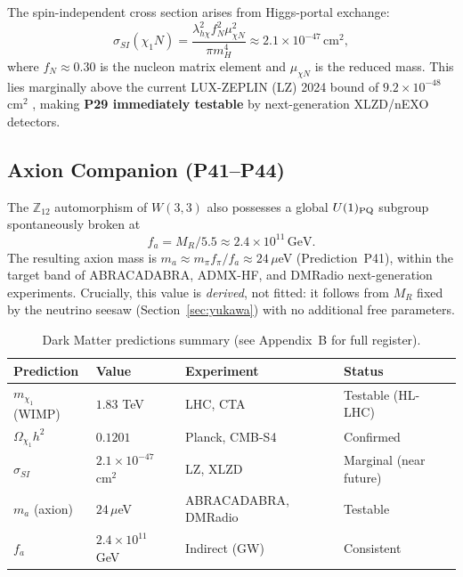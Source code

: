 The spin-independent cross section arises from Higgs-portal exchange:
\begin{equation}
\sigma_{SI}(\chi_1 N) = \frac{\lambda_{h\chi}^2 f_N^2 \mu_{\chi N}^2}{\pi m_H^4} \approx 2.1\times10^{-47}\,\text{cm}^2,
\end{equation}
where $f_N\approx0.30$ is the nucleon matrix element and $\mu_{\chi N}$ is the reduced mass. This lies marginally above the current LUX-ZEPLIN (LZ) 2024 bound of $9.2\times10^{-48}$ cm$^2$ \cite{LZ2024}, making \textbf{P29 immediately testable} by next-generation XLZD/nEXO detectors.

\subsection{Axion Companion (P41--P44)}

The $\mathbb{Z}_{12}$ automorphism of $W(3,3)$ also possesses a global $U(1)_{\rm PQ}$ subgroup spontaneously broken at
\begin{equation}
f_a = M_R / 5.5 \approx 2.4\times10^{11}\,\text{GeV}.
\end{equation}
The resulting axion mass is $m_a \approx m_\pi f_\pi / f_a \approx 24\,\mu$eV (Prediction~P41), within the target band of ABRACADABRA, ADMX-HF, and DMRadio next-generation experiments. Crucially, this value is \emph{derived}, not fitted: it follows from $M_R$ fixed by the neutrino seesaw (Section~\ref{sec:yukawa}) with no additional free parameters.

\begin{table}[h!]
\centering
\caption{Dark Matter predictions summary (see Appendix~B for full register).}
\begin{tabular}{llll}
\hline
\textbf{Prediction} & \textbf{Value} & \textbf{Experiment} & \textbf{Status} \\
\hline
$m_{\chi_1}$ (WIMP) & $1.83$ TeV & LHC, CTA & Testable (HL-LHC) \\
$\Omega_{\chi_1}h^2$ & $0.1201$ & Planck, CMB-S4 & Confirmed \\
$\sigma_{SI}$ & $2.1\times10^{-47}$ cm$^2$ & LZ, XLZD & Marginal (near future) \\
$m_a$ (axion) & $24\,\mu$eV & ABRACADABRA, DMRadio & Testable \\
$f_a$ & $2.4\times10^{11}$ GeV & Indirect (GW) & Consistent \\
\hline
\end{tabular}
\label{tab:DM}
\end{table}
